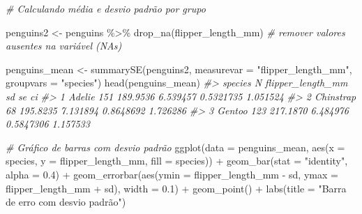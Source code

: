 \documentclass[
]{book}
\newenvironment{Shaded}{\begin{snugshade}}{\end{snugshade}}
\newcommand{\AttributeTok}[1]{\textcolor[rgb]{0.61,0.61,0.61}{#1}}
\newcommand{\CommentTok}[1]{\textcolor[rgb]{0.37,0.37,0.37}{\textit{#1}}}
\newcommand{\FloatTok}[1]{\textcolor[rgb]{0.06,0.06,0.06}{#1}}
\newcommand{\FunctionTok}[1]{\textcolor[rgb]{0,0,0}{#1}}
\newcommand{\NormalTok}[1]{#1}
\newcommand{\OtherTok}[1]{\textcolor[rgb]{0.37,0.37,0.37}{#1}}
\newcommand{\SpecialCharTok}[1]{\textcolor[rgb]{0,0,0}{#1}}
\newcommand{\StringTok}[1]{\textcolor[rgb]{0.5,0.5,0.5}{#1}}
\begin{document}
\begin{Shaded}
\begin{Highlighting}[]

\CommentTok{\# Calculando média e desvio padrão por grupo}

\NormalTok{penguins2 }\OtherTok{\textless{}{-}}\NormalTok{ penguins }\SpecialCharTok{\%\textgreater{}\%} 
  \FunctionTok{drop\_na}\NormalTok{(flipper\_length\_mm) }\CommentTok{\# remover valores ausentes na variável (NAs)}

\NormalTok{penguins\_mean }\OtherTok{\textless{}{-}} \FunctionTok{summarySE}\NormalTok{(penguins2, }
                           \AttributeTok{measurevar =} \StringTok{"flipper\_length\_mm"}\NormalTok{,}
                           \AttributeTok{groupvars =} \StringTok{"species"}\NormalTok{)}
\FunctionTok{head}\NormalTok{(penguins\_mean)}
\CommentTok{\#\textgreater{}     species   N flipper\_length\_mm       sd        se       ci}
\CommentTok{\#\textgreater{} 1    Adelie 151          189.9536 6.539457 0.5321735 1.051524}
\CommentTok{\#\textgreater{} 2 Chinstrap  68          195.8235 7.131894 0.8648692 1.726286}
\CommentTok{\#\textgreater{} 3    Gentoo 123          217.1870 6.484976 0.5847306 1.157533}

\CommentTok{\# Gráfico de barras com desvio padrão}
\FunctionTok{ggplot}\NormalTok{(}\AttributeTok{data =}\NormalTok{ penguins\_mean, }
       \FunctionTok{aes}\NormalTok{(}\AttributeTok{x =}\NormalTok{ species, }
           \AttributeTok{y =}\NormalTok{ flipper\_length\_mm, }
           \AttributeTok{fill =}\NormalTok{ species)) }\SpecialCharTok{+}
  \FunctionTok{geom\_bar}\NormalTok{(}\AttributeTok{stat =} \StringTok{"identity"}\NormalTok{, }\AttributeTok{alpha =} \FloatTok{0.4}\NormalTok{) }\SpecialCharTok{+}
  \FunctionTok{geom\_errorbar}\NormalTok{(}\FunctionTok{aes}\NormalTok{(}\AttributeTok{ymin =}\NormalTok{ flipper\_length\_mm }\SpecialCharTok{{-}}\NormalTok{ sd,}
                    \AttributeTok{ymax =}\NormalTok{ flipper\_length\_mm }\SpecialCharTok{+}\NormalTok{ sd),}
                \AttributeTok{width =} \FloatTok{0.1}\NormalTok{) }\SpecialCharTok{+} 
  \FunctionTok{geom\_point}\NormalTok{() }\SpecialCharTok{+}
  \FunctionTok{labs}\NormalTok{(}\AttributeTok{title =} \StringTok{"Barra de erro com desvio padrão"}\NormalTok{)}


\end{Highlighting}
\end{Shaded}
\end{document}
